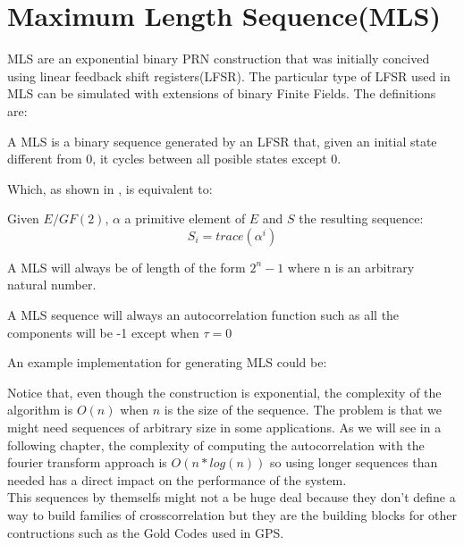 \section{Maximum Length Sequence(MLS)}

MLS are an exponential binary PRN construction that was initially concived
using linear feedback shift registers(LFSR). The particular type of LFSR used
in MLS can be simulated with extensions of binary Finite Fields. The
definitions are:

\begin{definition}[LFSR]
  A MLS is a binary sequence generated by an LFSR that, given an initial state
  different from 0, it cycles between all posible states except 0.
\end{definition}

Which, as shown in \citet{golomb_ref}, is equivalent to:

\begin{definition}
  Given $E/GF(2)$, $\alpha$ a primitive element of $E$ and $S$ the resulting
  sequence:
  \begin{equation}
    S_{i} = trace(\alpha^{i})
  \end{equation}
\end{definition}

\begin{property}
  A MLS will always be of length of the form $2^{n}-1$ where n is an arbitrary
  natural number.
\end{property}

\begin{property}
  A MLS sequence will always an autocorrelation function such as all the
  components will be -1 except when $\tau = 0$
\end{property}

An example implementation for generating MLS could be:


Notice that, even though the construction is exponential, the complexity of
the algorithm is $O(n)$ when $n$ is the size of the sequence. The problem is
that we might need sequences of arbitrary size in some applications. As we will
see in a following chapter, the complexity of computing the autocorrelation
with the fourier transform approach is $O(n*log(n))$ so using longer sequences
than needed has a direct impact on the performance of the system. \\

This sequences by themselfs might not a be huge deal because they don't define
a way to build families of crosscorrelation but they are the building blocks
for other contructions such as the Gold Codes used in GPS.
